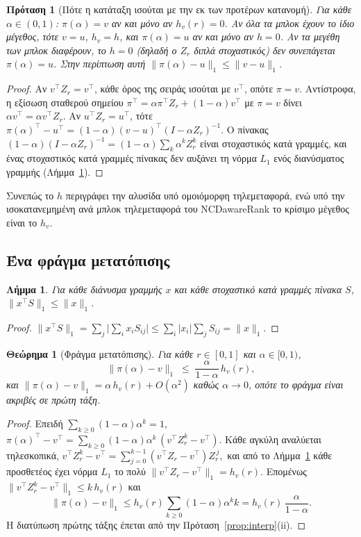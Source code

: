 \documentclass[11pt,a4paper]{article}
\newtheorem{theorem}{Θεώρημα}
\newtheorem{proposition}{Πρόταση}
\newtheorem{lemma}{Λήμμα}
\theoremstyle{definition}
\theoremstyle{remark}
\begin{document}
\begin{proposition}[Πότε η κατάταξη ισούται με την εκ των προτέρων κατανομή]\label{prop:fixed}
Για κάθε $\alpha\in(0,1)$: $\pi(\alpha)=v$ αν και μόνο αν $h_v(r)=0$. Αν όλα τα μπλοκ έχουν το ίδιο
μέγεθος, τότε $v=u$, $h_v=h$, και $\pi(\alpha)=u$ αν και μόνο αν $h=0$. Αν τα μεγέθη των μπλοκ
διαφέρουν, το $h=0$ (δηλαδή ο $Z_r$ διπλά στοχαστικός) \emph{δεν} συνεπάγεται $\pi(\alpha)=u$. Στην
περίπτωση αυτή $\|\pi(\alpha)-u\|_1\le\|v-u\|_1$.
\end{proposition}
\begin{proof}
Αν $v^\top Z_r=v^\top$, κάθε όρος της σειράς ισούται με $v^\top$, οπότε $\pi=v$. Αντίστροφα, η
εξίσωση σταθερού σημείου $\pi^\top=\alpha\pi^\top Z_r+(1-\alpha)v^\top$ με $\pi=v$ δίνει
$\alpha v^\top=\alpha v^\top Z_r$. Αν $u^\top Z_r=u^\top$, τότε
$\pi(\alpha)^\top-u^\top=(1-\alpha)(v-u)^\top(I-\alpha Z_r)^{-1}$. Ο πίνακας
$(1-\alpha)(I-\alpha Z_r)^{-1}=(1-\alpha)\sum_k\alpha^kZ_r^k$ είναι στοχαστικός κατά γραμμές, και ένας
στοχαστικός κατά γραμμές πίνακας δεν αυξάνει τη νόρμα $L_1$ ενός διανύσματος γραμμής
(Λήμμα~\ref{lem:contract}).
\end{proof}
\noindent
Συνεπώς το $h$ περιγράφει την αλυσίδα υπό ομοιόμορφη τηλεμεταφορά, ενώ υπό την ισοκατανεμημένη ανά
μπλοκ τηλεμεταφορά του NCDawareRank το κρίσιμο μέγεθος είναι το $h_v$.

\subsection{Ένα φράγμα μετατόπισης}

\begin{lemma}\label{lem:contract}
Για κάθε διάνυσμα γραμμής $x$ και κάθε στοχαστικό κατά γραμμές πίνακα $S$, $\|x^\top S\|_1\le\|x\|_1$.
\end{lemma}
\begin{proof}
$\|x^\top S\|_1=\sum_j\bigl|\sum_ix_iS_{ij}\bigr|\le\sum_i|x_i|\sum_jS_{ij}=\|x\|_1$.
\end{proof}

\begin{theorem}[Φράγμα μετατόπισης]\label{thm:bound}
Για κάθε $r\in[0,1]$ και $\alpha\in[0,1)$,
\begin{equation}
\|\pi(\alpha)-v\|_1\;\le\;\frac{\alpha}{1-\alpha}\,h_v(r),
\label{eq:bound}
\end{equation}
και $\|\pi(\alpha)-v\|_1=\alpha\,h_v(r)+O(\alpha^2)$ καθώς $\alpha\to0$, οπότε το φράγμα είναι ακριβές
σε πρώτη τάξη.
\end{theorem}
\begin{proof}
Επειδή $\sum_{k\ge0}(1-\alpha)\alpha^k=1$,
\(
\pi(\alpha)^\top-v^\top=\sum_{k\ge0}(1-\alpha)\alpha^k\,(v^\top Z_r^k-v^\top).
\)
Κάθε αγκύλη αναλύεται τηλεσκοπικά,
\(
v^\top Z_r^k-v^\top=\sum_{j=0}^{k-1}(v^\top Z_r-v^\top)Z_r^{\,j},
\)
και από το Λήμμα~\ref{lem:contract} κάθε προσθετέος έχει νόρμα $L_1$ το πολύ
$\|v^\top Z_r-v^\top\|_1=h_v(r)$. Επομένως $\|v^\top Z_r^k-v^\top\|_1\le k\,h_v(r)$ και
\[
\|\pi(\alpha)-v\|_1\le h_v(r)\sum_{k\ge0}(1-\alpha)\alpha^k k=h_v(r)\,\frac{\alpha}{1-\alpha}.
\]
Η διατύπωση πρώτης τάξης έπεται από την Πρόταση~\ref{prop:interp}(ii).
\end{proof}
\end{document}
